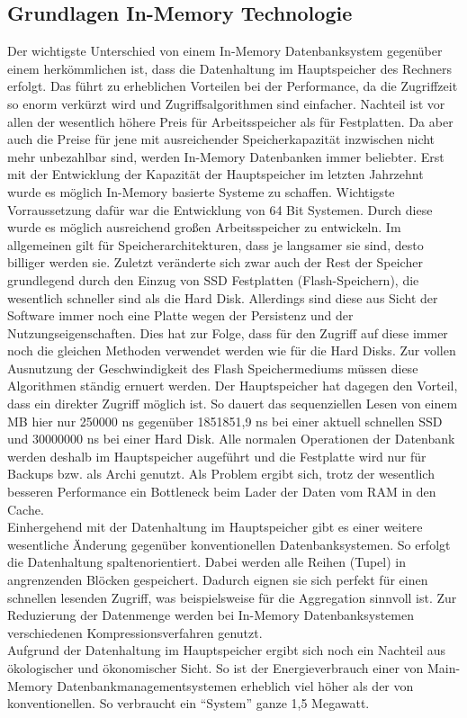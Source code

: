 \documentclass[a4paper, 12pt]{scrartcl}
\begin{document}
\subsection{Grundlagen In-Memory Technologie}
Der wichtigste Unterschied von einem In-Memory Datenbanksystem gegenüber einem herkömmlichen ist, dass die Datenhaltung im Hauptspeicher des Rechners erfolgt. Das führt zu erheblichen Vorteilen bei der Performance, da die Zugriffzeit so enorm verkürzt wird und Zugriffsalgorithmen sind einfacher. Nachteil ist vor allen der wesentlich höhere Preis für Arbeitsspeicher als für Festplatten. Da aber auch die Preise für jene mit ausreichender Speicherkapazität inzwischen nicht mehr unbezahlbar sind, werden In-Memory Datenbanken immer beliebter. Erst mit der Entwicklung der Kapazität der Hauptspeicher im letzten Jahrzehnt wurde es möglich In-Memory basierte Systeme zu schaffen. Wichtigste Vorraussetzung dafür war die Entwicklung von 64 Bit Systemen. Durch diese wurde es möglich ausreichend großen Arbeitsspeicher zu entwickeln. Im allgemeinen gilt für Speicherarchitekturen, dass je langsamer sie sind, desto billiger werden sie. Zuletzt veränderte sich zwar auch der Rest der Speicher grundlegend durch den Einzug von SSD Festplatten (Flash-Speichern), die wesentlich schneller sind als die Hard Disk. Allerdings sind diese aus Sicht der Software immer noch eine Platte wegen der Persistenz und der Nutzungseigenschaften. Dies hat zur Folge, dass für den Zugriff auf diese immer noch die gleichen Methoden verwendet werden wie für die Hard Disks. Zur vollen Ausnutzung der Geschwindigkeit des Flash Speichermediums müssen diese Algorithmen ständig ernuert werden. Der Hauptspeicher hat dagegen den Vorteil, dass ein direkter Zugriff möglich ist. So dauert das sequenziellen Lesen von einem MB hier nur 250000 ns gegenüber 1851851,9 ns bei einer aktuell schnellen SSD und 30000000 ns bei einer Hard Disk. Alle normalen Operationen der Datenbank werden deshalb im Hauptspeicher augeführt und die Festplatte wird nur für Backups bzw. als Archi genutzt. Als Problem ergibt sich, trotz der wesentlich besseren Performance ein Bottleneck beim Lader der Daten vom RAM in den Cache. \\Einhergehend mit der Datenhaltung im Hauptspeicher gibt es einer weitere wesentliche Änderung gegenüber konventionellen Datenbanksystemen. So erfolgt die Datenhaltung spaltenorientiert. Dabei werden alle Reihen (Tupel) in angrenzenden Blöcken gespeichert. Dadurch eignen sie sich perfekt für einen schnellen lesenden Zugriff, was beispielsweise für die Aggregation sinnvoll ist. Zur Reduzierung der Datenmenge werden bei In-Memory Datenbanksystemen verschiedenen Kompressionsverfahren genutzt. \\ Aufgrund der Datenhaltung im Hauptspeicher ergibt sich noch ein Nachteil aus ökologischer und ökonomischer Sicht. So ist der Energieverbrauch einer von Main-Memory Datenbankmanagementsystemen erheblich viel höher als der von konventionellen. So verbraucht ein "`System"' ganze 1,5 Megawatt. 
\newpage
\end{document}
